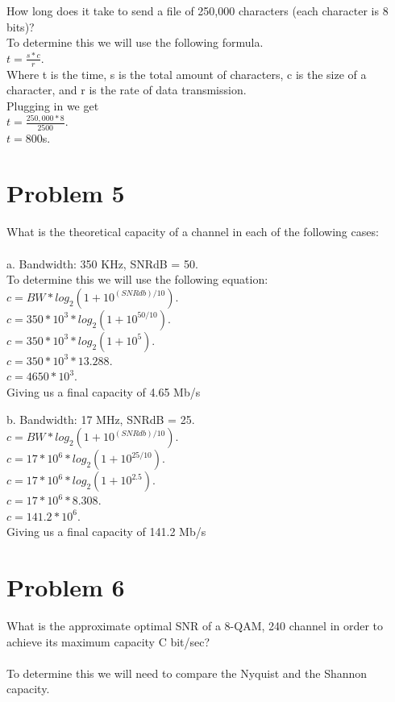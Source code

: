 \documentclass{article}
\begin{document}
\subP How long does it take to send a file of 250,000 characters (each
character is 8 bits)?\\
To determine this we will use the following formula.\\
$t = \frac{s*c}{r}$.\\
Where t is the time, s is the total amount of characters, c is the size of a character,
and r is the rate of data transmission.\\
Plugging in we get\\
$t = \frac{250,000 * 8}{2500}$.\\
$t = 800$s.\\

\section*{Problem 5} %
What is the theoretical capacity of a channel in each of the following cases:\\\\
\subP a. Bandwidth: 350 KHz, SNRdB = 50.\\
To determine this we will use the following equation:\\
$c = BW * log_{2}(1 + 10^{(SNRdb)/10})$.\\
$c = 350 * 10^{3} * log_{2}(1 + 10^{50/10})$.\\
$c = 350 * 10^{3} * log_{2}(1 + 10^{5})$.\\
$c = 350 * 10^{3} * 13.288$.\\
$c = 4650 * 10^{3}$.\\
Giving us a final capacity of 4.65 Mb/s

\subP b. Bandwidth: 17 MHz, SNRdB = 25.\\
$c = BW * log_{2}(1 + 10^{(SNRdb)/10})$.\\
$c = 17 * 10^{6} * log_{2}(1 + 10^{25/10})$.\\
$c = 17 * 10^{6} * log_{2}(1 + 10^{2.5})$.\\
$c = 17 * 10^{6} * 8.308$.\\
$c = 141.2 * 10^{6}$.\\
Giving us a final capacity of 141.2 Mb/s


\section*{Problem 6}
What is the approximate optimal SNR of a 8-QAM, 240 channel in order to achieve its
maximum capacity C bit/sec?\\\\
To determine this we will need to compare the Nyquist and the Shannon capacity.\\
\end{document}
